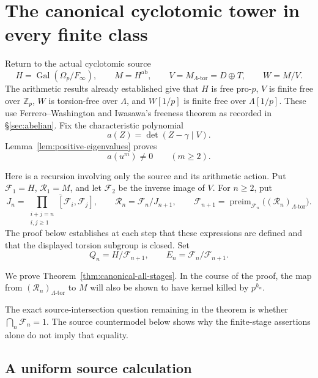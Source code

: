 \documentclass[11pt]{article}
\theoremstyle{definition}\newtheorem{definition}[theorem]{Definition}
\begin{document}
\section{The canonical cyclotomic tower in every finite class}
\label{sec:canonical-all-stages}

Return to the actual cyclotomic source
\[
 H=\operatorname{Gal}(\Omega_p/F_\infty),\qquad
 M=H^{\mathrm{ab}},\qquad
 V=M_{\Lambda\text{-tor}}=D\oplus T,\qquad W=M/V.
\]
The arithmetic results already established give that \(H\) is free
pro-\(p\), \(V\) is finite free over \(\mathbb Z_p\), \(W\) is
torsion-free over \(\Lambda\), and \(W[1/p]\) is finite free over
\(\Lambda[1/p]\).  These use Ferrero--Washington and Iwasawa's
freeness theorem as recorded in \S\ref{sec:abelian}.
Fix the characteristic polynomial
\[
               a(Z)=\det(Z-\gamma\mid V).
\]
Lemma~\ref{lem:positive-eigenvalues} proves
\begin{equation}\label{eq:uniform-positive-exclusion}
                       a(u^m)\ne0\qquad(m\geq2).
\end{equation}

Here is a recursion involving only the source and its arithmetic
action.  Put \(\mathcal F_1=H\), \(\mathcal R_1=M\), and let \(\mathcal F_2\) be the inverse
image of \(V\).  For \(n\geq2\), put
\begin{equation}\label{eq:uniform-recursion}
 J_n=\overline{\prod_{\substack{i+j=n\\i,j\geq1}}[\mathcal F_i,\mathcal F_j]},
 \qquad
 \mathcal R_n=\mathcal F_n/J_{n+1},
 \qquad
 \mathcal F_{n+1}=\operatorname{preim}_{\mathcal F_n}
                  \bigl((\mathcal R_n)_{\Lambda\text{-tor}}\bigr).
\end{equation}
The proof below establishes at each step that these expressions
are defined and that the displayed torsion subgroup is closed.
Set
\[
 Q_n=H/\mathcal F_{n+1},\qquad E_n=\mathcal F_n/\mathcal F_{n+1}.
\]

We prove Theorem~\ref{thm:canonical-all-stages}. In the course of the proof, the map from \((\mathcal R_n)_{\Lambda\text{-tor}}\) to \(M\) will also be shown to have kernel killed by \(p^{h_n}\).

The exact source-intersection question remaining in the theorem is whether
\(\bigcap_n\mathcal F_n=1\).  The source countermodel below shows why the
finite-stage assertions alone do not imply that equality.

\subsection{A uniform source calculation}
\end{document}
